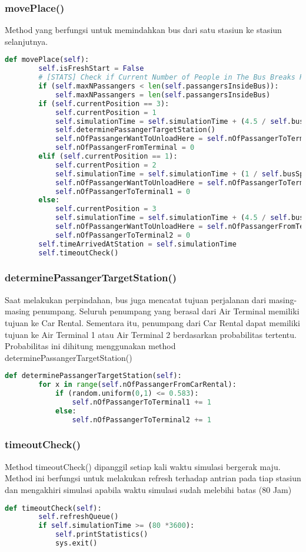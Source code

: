 \documentclass{article}
\begin{document}
\subsubsection{movePlace()}
Method yang berfungsi untuk memindahkan bus dari satu stasiun ke stasiun selanjutnya. 
\begin{lstlisting}[language=Python]
def movePlace(self):
		self.isFreshStart = False	
		# [STATS] Check if Current Number of People in The Bus Breaks Record
		if (self.maxNPassangers < len(self.passangersInsideBus)):
			self.maxNPassangers = len(self.passangersInsideBus)
		if (self.currentPosition == 3):
			self.currentPosition = 1
			self.simulationTime = self.simulationTime + (4.5 / self.busSpeed * 3600)
			self.determinePassangerTargetStation()
			self.nOfPassangerWantToUnloadHere = self.nOfPassangerToTerminal1
			self.nOfPassangerFromTerminal = 0
		elif (self.currentPosition == 1):
			self.currentPosition = 2
			self.simulationTime = self.simulationTime + (1 / self.busSpeed * 3600)
			self.nOfPassangerWantToUnloadHere = self.nOfPassangerToTerminal2
			self.nOfPassangerToTerminal1 = 0
		else:
			self.currentPosition = 3
			self.simulationTime = self.simulationTime + (4.5 / self.busSpeed * 3600)
			self.nOfPassangerWantToUnloadHere = self.nOfPassangerFromTerminal
			self.nOfPassangerToTerminal2 = 0
		self.timeArrivedAtStation = self.simulationTime
		self.timeoutCheck()
\end{lstlisting}

\subsubsection{determinePassangerTargetStation()}
Saat melakukan perpindahan, bus juga mencatat tujuan perjalanan dari masing-masing penumpang.
Seluruh penumpang yang berasal dari Air Terminal memiliki tujuan ke Car Rental.
Sementara itu, penumpang dari Car Rental dapat memiliki tujuan ke Air Terminal 1 atau Air Terminal 2 berdasarkan
probabilitas tertentu. Probabilitas ini dihitung menggunakan method determinePassangerTargetStation()
\begin{lstlisting}[language=Python]
def determinePassangerTargetStation(self):
		for x in range(self.nOfPassangerFromCarRental):
			if (random.uniform(0,1) <= 0.583):
				self.nOfPassangerToTerminal1 += 1
			else:
				self.nOfPassangerToTerminal2 += 1
\end{lstlisting}

\subsubsection{timeoutCheck()}
Method timeoutCheck() dipanggil setiap kali waktu simulasi bergerak maju. Method ini berfungsi untuk melakukan refresh terhadap antrian pada tiap stasiun dan mengakhiri simulasi apabila waktu simulasi sudah melebihi batas (80 Jam)
\begin{lstlisting}[language=Python]
def timeoutCheck(self):
		self.refreshQueue()
		if self.simulationTime >= (80 *3600):
			self.printStatistics()
			sys.exit()
\end{lstlisting}
\end{document}
